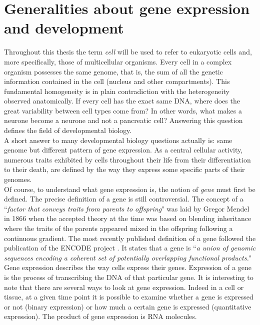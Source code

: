 \section{Generalities about gene expression and development}\label{sec:gene_expression_background}     
       
     Throughout this thesis the term \emph{cell} will be used to refer to eukaryotic cells and, more specifically, those of multicellular organisms. Every cell in a complex organism possesses the same genome, that is, the sum of all the genetic information contained in the cell (nucleus and other compartments). This fundamental homogeneity is in plain contradiction with the heterogeneity observed anatomically. If every cell has the exact same DNA, where does the great variability between cell types come from? In other words, what makes a neurone become a neurone and not a pancreatic cell? Answering this question defines the field of developmental biology.\\
     
     A short answer to many developmental biology questions actually is: same genome but different pattern of gene expression. As a central cellular activity, numerous traits exhibited by cells throughout their life from their differentiation to their death, are defined by the way they express some specific parts of their genomes.\\

     Of course, to understand what gene expression is, the notion of \emph{gene} must first be defined. The precise definition of a gene is still controversial. The concept of a ``\emph{factor that conveys traits from parents to offspring}" was laid by Gregor Mendel in 1866 \cite{mendel66} when the accepted theory at the time was based on blending inheritance where the traits of the parents appeared mixed in the offspring following a continuous gradient. The most recently published definition of a gene followed the publication of the ENCODE project \cite{feingold04}. It states that a gene is ``\emph{a union of genomic sequences encoding a coherent set of potentially overlapping functional products.}"\\

	Gene expression describes the way cells express their genes. Expression of a gene is the process of transcribing the DNA of that particular gene. It is interesting to note that there are several ways to look at gene expression. Indeed in a cell or tissue, at a given time point it is possible to examine whether a gene is expressed or not (binary expression) or how much a certain gene is expressed (quantitative expression). The product of gene expression is RNA molecules.\\
	
